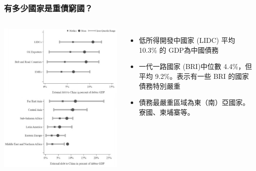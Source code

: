 \begin{frame}
    \frametitle{有多少國家是重債窮國？}

    \begin{columns}
        \includegraphics[height = 0.9\textheight]{fig/fig7.jpg}
        \begin{itemize}
            \item 低所得開發中國家 (LIDC) 平均 10.3\% 的 GDP為中國債務
            \item 一代一路國家 (BRI)中位數 4.4\%，但平均 9.2\%。表示有一些 BRI 的國家債務特別嚴重
            \item 債務最嚴重區域為東（南）亞國家。寮國、柬埔寨等。
        \end{itemize}
    \end{columns}

\end{frame}

